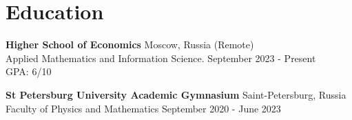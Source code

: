 \section{\sc Education}

\textbf{Higher School of Economics} \hfill Moscow, Russia (Remote) \\
Applied Mathematics and Information Science. \hfill September 2023 - Present \\
GPA: 6/10

\textbf{St Petersburg University Academic Gymnasium} \hfill	Saint-Petersburg, Russia \\
Faculty of Physics and Mathematics \hfill September 2020 - June 2023

\endinput
